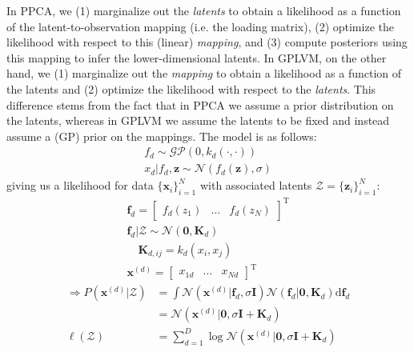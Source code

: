 \documentclass[a4paper]{article}
\begin{document}
In PPCA, we (1) marginalize out the \emph{latents} to obtain a likelihood as a function of the latent-to-observation mapping (i.e. the loading matrix), (2) optimize the likelihood with respect to this (linear) \emph{mapping}, and (3) compute posteriors using this mapping to infer the lower-dimensional latents. In GPLVM, on the other hand, we (1) marginalize out the \emph{mapping} to obtain a likelihood as a function of the latents and  (2) optimize the likelihood with respect to the \emph{latents}. This difference stems from the fact that in PPCA we assume a prior distribution on the latents, whereas in GPLVM we assume the latents to be fixed and instead assume a (GP) prior on the mappings. The model is as follows:
\begin{gather*}
f_d \sim \mathcal{GP}\left(0,k_d(\cdot,\cdot)\right) \\
x_d|f_d,\mathbf{z} \sim \mathcal{N}\left(f_d(\mathbf{z}),\sigma\right)
\end{gather*}
giving us a likelihood for data $\{\mathbf{x}_i\}_{i=1}^N$ with associated latents $\mathcal{Z} = \{\mathbf{z}_i\}_{i=1}^N$:
\begin{gather*}
\mathbf{f}_d = \begin{bmatrix} f_d(z_1) & \ldots & f_d(z_N) \end{bmatrix}^\textrm{T} \\
\mathbf{f}_d|\mathcal{Z} \sim \mathcal{N}(\mathbf{0},\mathbf{K}_d) \\
\quad \mathbf{K}_{d,ij} = k_d(x_i,x_j) \\
\mathbf{x}^{(d)} = \begin{bmatrix} x_{1d} & \ldots & x_{Nd} \end{bmatrix}^\textrm{T}
\end{gather*}
\begin{align*}
\Rightarrow P(\mathbf{x}^{(d)}|\mathcal{Z}) &= \int \mathcal{N}(\mathbf{x}^{(d)}|\mathbf{f}_d,\sigma \mathbf{I}) \mathcal{N}(\mathbf{f}_d|\mathbf{0},\mathbf{K}_d) \textrm{d}\mathbf{f}_d \\
&= \mathcal{N}(\mathbf{x}^{(d)}|\mathbf{0},\sigma \mathbf{I} + \mathbf{K}_d) \\
\ell(\mathcal{Z}) &= \sum_{d=1}^D \log \mathcal{N}(\mathbf{x}^{(d)}|\mathbf{0},\sigma \mathbf{I} + \mathbf{K}_d)
\end{align*}
\end{document}
